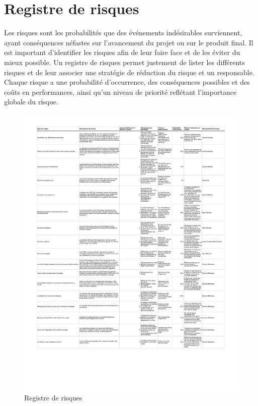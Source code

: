 \chapter{Registre de risques}

Les risques sont les probabilités que des événements indésirables surviennent, ayant conséquences néfastes sur l'avancement du projet ou sur le produit final. Il est important d'identifier les risques afin de leur faire face et de les éviter du mieux possible. Un registre de risques permet justement de lister les différents risques et de leur associer une stratégie de réduction du risque et un responsable. Chaque risque a une probabilité d'occurrence, des conséquences possibles et des coûts en performances, ainsi qu'un niveau de priorité reflétant l'importance globale du risque.

\begin{figure}
  \centering 
  \caption{Registre de risques}
  \includegraphics[scale=0.80, angle=0]{resources/risques.pdf}
\end{figure}


